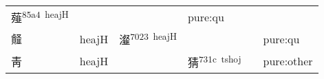 \documentclass[14pt,a4paper]{scrartcl}
\begin{document}
\begin{longtable}[c]{@{}llllll@{}}
\begin{minipage}[t]{0.14\columnwidth}
薤\textsuperscript{85a4~heajH}
\strut\end{minipage} &
\begin{minipage}[t]{0.14\columnwidth}\raggedright\strut
\strut\end{minipage} &
\begin{minipage}[t]{0.14\columnwidth}\raggedright\strut
\strut\end{minipage} &
\begin{minipage}[t]{0.14\columnwidth}\raggedright\strut
pure:qu
\strut\end{minipage}\tabularnewline
\begin{minipage}[t]{0.14\columnwidth}\raggedright\strut
䪥
\strut\end{minipage} &
\begin{minipage}[t]{0.14\columnwidth}\raggedright\strut
heajH
\strut\end{minipage} &
\begin{minipage}[t]{0.14\columnwidth}\raggedright\strut
瀣\textsuperscript{7023~heajH}
\strut\end{minipage} &
\begin{minipage}[t]{0.14\columnwidth}\raggedright\strut
\strut\end{minipage} &
\begin{minipage}[t]{0.14\columnwidth}\raggedright\strut
\strut\end{minipage} &
\begin{minipage}[t]{0.14\columnwidth}\raggedright\strut
pure:qu
\strut\end{minipage}\tabularnewline
\begin{minipage}[t]{0.14\columnwidth}\raggedright\strut
靑
\strut\end{minipage} &
\begin{minipage}[t]{0.14\columnwidth}\raggedright\strut
heajH
\strut\end{minipage} &
\begin{minipage}[t]{0.14\columnwidth}\raggedright\strut
\strut\end{minipage} &
\begin{minipage}[t]{0.14\columnwidth}\raggedright\strut
猜\textsuperscript{731c~tshoj}
\strut\end{minipage} &
\begin{minipage}[t]{0.14\columnwidth}\raggedright\strut
\strut\end{minipage} &
\begin{minipage}[t]{0.14\columnwidth}\raggedright\strut
pure:other
\strut\end{minipage}\tabularnewline

\end{longtable}
\end{document}
